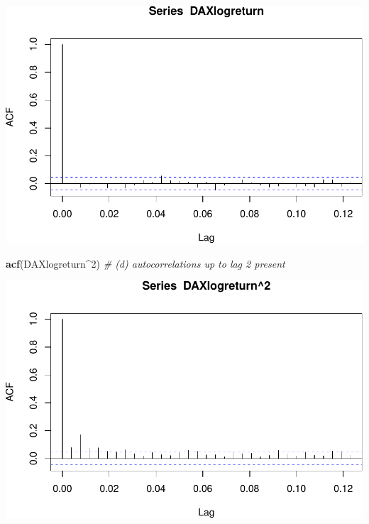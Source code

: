 \documentclass[
]{article}
\newenvironment{Shaded}{\begin{snugshade}}{\end{snugshade}}
\newcommand{\CommentTok}[1]{\textcolor[rgb]{0.56,0.35,0.01}{\textit{#1}}}
\newcommand{\DecValTok}[1]{\textcolor[rgb]{0.00,0.00,0.81}{#1}}
\newcommand{\FunctionTok}[1]{\textcolor[rgb]{0.13,0.29,0.53}{\textbf{#1}}}
\newcommand{\NormalTok}[1]{#1}
\newcommand{\SpecialCharTok}[1]{\textcolor[rgb]{0.81,0.36,0.00}{\textbf{#1}}}
\begin{document}
\includegraphics{a4_files/figure-latex/unnamed-chunk-2-1.pdf}

\begin{Shaded}
\begin{Highlighting}[]
\FunctionTok{acf}\NormalTok{(DAXlogreturn}\SpecialCharTok{\^{}}\DecValTok{2}\NormalTok{) }\CommentTok{\# (d) autocorrelations up to lag 2 present}
\end{Highlighting}
\end{Shaded}

\includegraphics{a4_files/figure-latex/unnamed-chunk-2-2.pdf}
\end{document}

